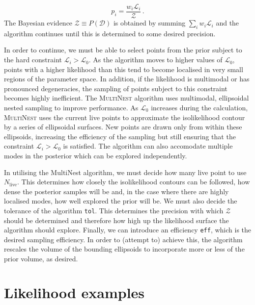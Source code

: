 \begin{equation}
p_i = \frac{w_i \mathcal{L}_i}{\mathcal{Z}}\,.
\end{equation}
The Bayesian evidence $\mathcal{Z} \equiv P(\mathcal{D})$ is obtained by summing $\sum_i w_i \mathcal{L}_i$ and the algorithm continues until this is determined to some desired precision.

In order to continue, we must be able to select points from the prior subject to the hard constraint $\mathcal{L}_i > \mathcal{L}_0$. As the algorithm moves to higher values of $\mathcal{L}_0$, points with a higher likelihood than this tend to become localised in very small regions of the parameter space. In addition, if the likelihood is multimodal or has pronounced degeneracies, the sampling of points subject to this constraint becomes highly inefficient. The \textsc{MultiNest} algorithm \cite{Feroz:2007,Feroz:2008,Feroz:2014} uses multimodal, ellipsoidal nested sampling to improve performance. As $\mathcal{L}_0$ increases during the calculation,  \textsc{MultiNest} uses the current live points to approximate the isolikelihood contour by a series of ellipsoidal surfaces. New points are drawn only from within these ellipsoids, increasing the efficiency of the sampling but still ensuring that the constraint $\mathcal{L}_i > \mathcal{L}_0$ is satisfied. The algorithm can also accomodate multiple modes in the posterior which can be explored independently.

In utilising the MultiNest algorithm, we must decide how many live point to use $N_\textrm{live}$. This determines how closely the isolikelihood contours can be followed, how dense the posterior samples will be and, in the case where there are highly localised modes, how well explored the prior will be. We must also decide the tolerance of the algorithm \texttt{tol}. This determines the precision with which $\mathcal{Z}$ should be determined and therefore how high up the likelihood surface the algorithm should explore. Finally, we can introduce an efficiency \texttt{eff}, which is the desired sampling efficiency. In order to (attempt to) achieve this, the algorithm rescales the volume of the bounding ellipsoids to incorporate more or less of the prior volume, as desired. 



\section{Likelihood examples}

